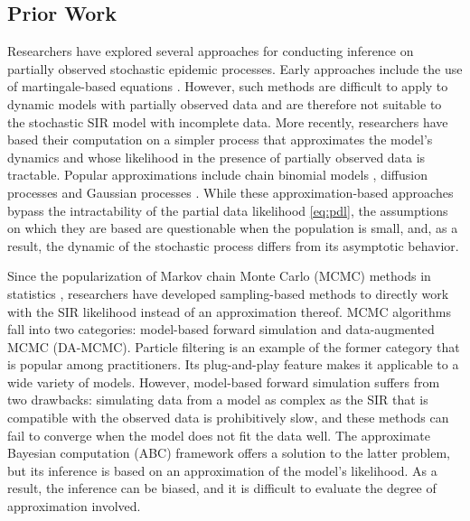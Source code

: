 \documentclass[11pt]{article}
\begin{document}
	\subsection{Prior Work}
	\label{sec:pre}
	Researchers have explored several approaches for conducting inference on partially observed stochastic epidemic processes. Early approaches include the use of martingale-based equations \cite{Becker.1977, Watson.1981, Sudbury.1985}. However, such methods are difficult to apply to dynamic models with partially observed data and are therefore not suitable to the stochastic SIR model with incomplete data.
	More recently, researchers have based their computation on a simpler process that approximates the model's dynamics and whose likelihood in the presence of partially observed data is tractable. Popular approximations include chain binomial models \cite{Greenwood.1931, Abbey.1952}, diffusion processes \cite{Cauchemez.2008, Fintzi.2020} and Gaussian processes \cite{Jandarov.2014}. While these approximation-based approaches bypass the intractability of the partial data likelihood \eqref{eq:pdl}, the assumptions on which they are based are questionable when the population is small, and, as a result, the dynamic of the stochastic process differs from its asymptotic behavior.
	
	Since the popularization of Markov chain Monte Carlo (MCMC) methods in statistics \cite{Tanner.1987, Gelfand.1990, Tierney.1994}, researchers have developed sampling-based methods to directly work with the SIR likelihood instead of an approximation thereof. MCMC algorithms fall into two categories: model-based forward simulation and data-augmented MCMC (DA-MCMC).
	Particle filtering \cite{King.2015} is an example of the former category that is popular among practitioners. Its plug-and-play feature makes it applicable to a wide variety of models. However, model-based forward simulation suffers from two drawbacks: simulating data from a model as complex as the SIR that is compatible with the observed data is prohibitively slow, and these methods can fail to converge when the model does not fit the data well. The approximate Bayesian computation (ABC) framework  \cite{McKinley.2018} offers a solution to the latter problem, but its inference is based on an approximation of the model's likelihood. As a result, the inference can be biased, and it is difficult to evaluate the degree of approximation involved. %
	
\end{document}
